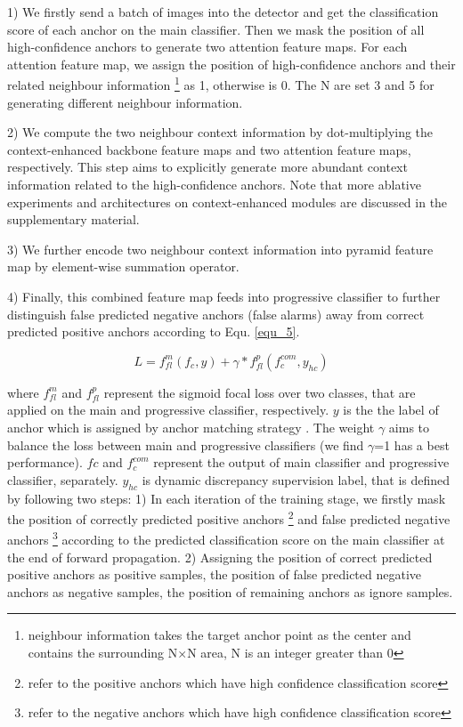 \documentclass[10pt,twocolumn,letterpaper]{article}
\begin{document}
1) We firstly send a batch of images into the detector and get the classification score of each anchor on the main classifier. Then we mask the position of all high-confidence anchors to generate two attention feature maps. For each attention feature map,  we assign the position of high-confidence  anchors and their related neighbour information \footnote{neighbour information takes the target anchor point as the center and contains the surrounding N$\times$N area, N is an integer greater than 0} as 1, otherwise is 0. The N are set 3 and 5 for generating different neighbour information.

2) We compute the two neighbour context information by dot-multiplying the context-enhanced backbone feature maps and  two attention feature maps, respectively. This step aims to explicitly generate more abundant context information related to the high-confidence anchors. Note that more ablative experiments and architectures on context-enhanced modules are discussed in the supplementary material.

3) We further encode two neighbour context information  into  pyramid feature map by element-wise summation operator. 

4) Finally, this combined feature map feeds into   progressive classifier to further distinguish false predicted negative anchors (false alarms)  away from correct predicted positive anchors according to Equ. \ref{equ_5}. 

\begin{equation}
    L = f_{fl}^{m}(f_c, y) + \gamma * f_{fl}^{p}(f_{c}^{com}, y_{hc}) \label{equ_5}
\end{equation}

where $f_{fl}^{m}$ and $f_{fl}^{p}$  represent the sigmoid focal loss \cite{lin2017focal} over two classes, that are applied on the main and progressive classifier, respectively. $y$ is the the label of anchor which is assigned by anchor matching strategy \cite{ren2015faster}. The weight $\gamma$ aims to balance the loss between main and progressive classifiers (we find $\gamma$=1 has a best performance). $fc$ and $f_{c}^{com}$ represent the output of main classifier and progressive classifier, separately.
$y_{hc}$ is dynamic discrepancy supervision label, that is  defined by following two steps: 1) In each iteration of the training stage, we  firstly  mask  the  position  of correctly predicted positive anchors \footnote{refer to the positive anchors which have high confidence classification score} and false predicted negative anchors \footnote{refer to the negative anchors which have high confidence classification score} according to the predicted  classification score on the main classifier at the end of forward propagation. 2) Assigning the position of  correct predicted positive anchors as positive samples, the position of false predicted negative anchors as  negative samples, the position of remaining anchors as ignore samples.
\end{document}
